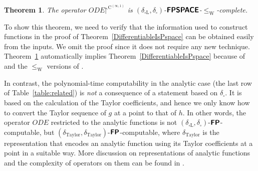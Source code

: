 \documentclass{lmcs}
\newtheorem{theorem}{Theorem}%
\theoremstyle{definition}
\theoremstyle{remark}
\newcommand{\N}{\mathbf N}
\newcommand{\OpIVP}{\mathit{ODE}}
\newcommand{\deltabox}{\delta _\square}
\newcommand{\deltaboxLip}{\delta _{\square \mathrm L}}
\newcommand{\deltaTaylor}{\delta _{\mathrm{Taylor}}}
\newcommand{\classtwofont}[1]{\text{\bfseries \sffamily \upshape #1}}
\newcommand{\classFPtwo}{\classtwofont{FP}}
\newcommand{\classFPSPACEtwo}{\classtwofont{FPSPACE}}
\newcommand{\classCHtwo}{\classtwofont{CH}}
\newcommand{\redW}{\leq _{\mathrm W}}
\newcommand{\classC}{\mathrm C}
\begin{document}
\begin{theorem}
\label{theorem: C1 constructive}
The operator $\OpIVP \mathord\upharpoonright ^{\classC ^{(\infty, 1)}}$ is $(\deltaboxLip, \deltabox)$-$\classFPSPACEtwo$-$\redW$-complete.
\end{theorem}

To show this theorem,
we need to verify that the information used to construct functions in the proof of Theorem~\ref{DifferentiableIsPspace}
can be obtained easily from the inputs.
We omit the proof since it does not require any new technique.
Theorem~\ref{theorem: C1 constructive}
automatically implies Theorem~\ref{DifferentiableIsPspace} 
because of \cite[Lemmas 4.7 and 4.8]{kawamura2010operators} and 
the $\redW$ versions of \cite[Lemmas 3.11 and 3.12]{kawamura2010operators}. 


In contrast, 
the polynomial-time computability in the analytic case
(the last row of Table~\ref{table:related})
is \emph{not} a consequence of a statement based on $\deltabox$. 
It is based on the calculation of the Taylor coefficients, 
and hence we only know how 
to convert the Taylor sequence of $g$ at a point to that of $h$. 
In other words, 
the operator $\OpIVP$ restricted to the analytic functions
is not $(\deltaboxLip, \deltabox)$-$\classFPtwo$-computable, 
but $(\deltaTaylor, \deltaTaylor)$-$\classFPtwo$-computable, 
where $\deltaTaylor$ is the representation that 
encodes an analytic function using its Taylor coefficients at a point 
in a suitable way. 
More discussion on representations of analytic functions 
and the complexity of operators on them 
can be found in 
\cite{kawamura12:_unifor_polyt_comput_operat_univar}. 
\end{document}
